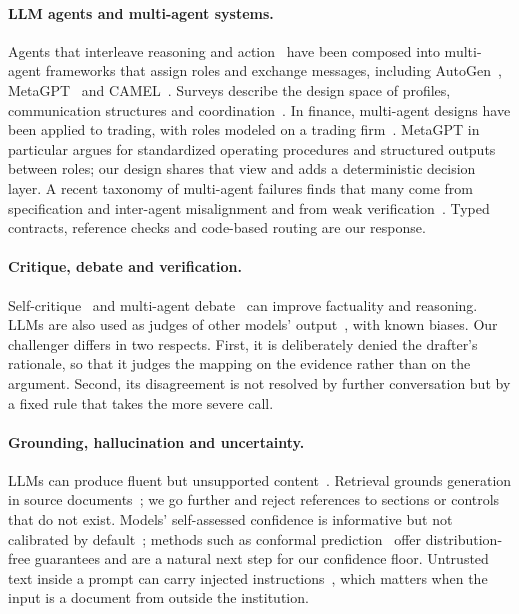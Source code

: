 \documentclass[sigconf,review,anonymous]{acmart}
\begin{document}
\paragraph{LLM agents and multi-agent systems.}
Agents that interleave reasoning and action~\cite{yao2023react} have been
composed into multi-agent frameworks that assign roles and exchange
messages, including AutoGen~\cite{wu2023autogen},
MetaGPT~\cite{hong2024metagpt} and CAMEL~\cite{li2023camel}. Surveys describe
the design space of profiles, communication structures and
coordination~\cite{guo2024mas,wang2024agentsurvey}. In finance, multi-agent
designs have been applied to trading, with roles modeled on a trading
firm~\cite{xiao2024tradingagents}. MetaGPT in particular argues for
standardized operating procedures and structured outputs between roles; our
design shares that view and adds a deterministic decision layer. A recent
taxonomy of multi-agent failures finds that many come from specification and
inter-agent misalignment and from weak verification~\cite{cemri2025mast}.
Typed contracts, reference checks and code-based routing are our response.

\paragraph{Critique, debate and verification.}
Self-critique~\cite{madaan2023selfrefine,shinn2023reflexion} and multi-agent
debate~\cite{du2024debate,liang2024divergent} can improve factuality and
reasoning. LLMs are also used as judges of other models'
output~\cite{zheng2023judge}, with known biases. Our challenger differs in
two respects. First, it is deliberately denied the drafter's rationale, so
that it judges the mapping on the evidence rather than on the argument.
Second, its disagreement is not resolved by further conversation but by a
fixed rule that takes the more severe call.

\paragraph{Grounding, hallucination and uncertainty.}
LLMs can produce fluent but unsupported content~\cite{ji2023hallucination}.
Retrieval grounds generation in source documents~\cite{lewis2020rag}; we go
further and reject references to sections or controls that do not exist.
Models' self-assessed confidence is informative but not
calibrated by default~\cite{kadavath2022know}; methods such as conformal
prediction~\cite{angelopoulos2021conformal} offer distribution-free
guarantees and are a natural next step for our confidence floor. Untrusted
text inside a prompt can carry injected instructions~\cite{greshake2023injection},
which matters when the input is a document from outside the institution.
\end{document}
